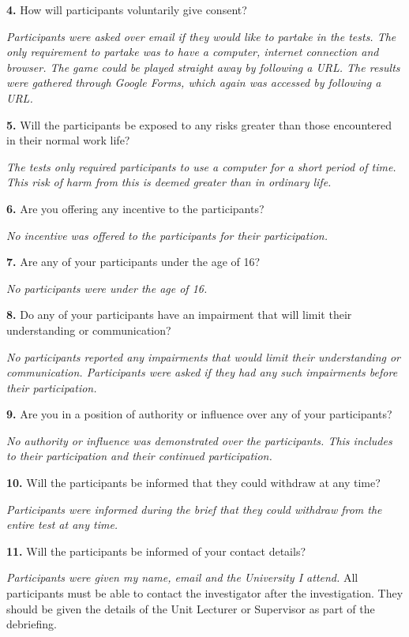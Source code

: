 \documentclass[a4paper,11.5pt]{report}
\numberwithin{figure}{section}
\numberwithin{table}{section}
\numberwithin{equation}{section}
\numberwithin{equation}{section}
\begin{document}
\textbf{4.}	How will participants voluntarily give consent?                       

\textit{Participants were asked over email if they would like to partake in the tests. The only requirement to partake was to have a computer, internet connection and browser. The game could be played straight away by following a URL. The results were gathered through Google Forms, which again was accessed by following a URL.}

\textbf{5.}	Will the participants be exposed to any risks greater than those encountered in their normal work life? 

\textit{The tests only required participants to use a computer for a short period of time. This risk of harm from this is deemed greater than in ordinary life.}

\textbf{6.}	Are you offering any incentive to the participants? 

\textit{No incentive was offered to the participants for their participation.}

\textbf{7.}	Are any of your participants under the age of 16?             

\textit{No participants were under the age of 16.}

\textbf{8.}	Do any of your participants have an impairment that will limit their understanding or communication?  

\textit{No participants reported any impairments that would limit their understanding or communication. Participants were asked if they had any such impairments before their participation.}

\textbf{9.}	Are you in a position of authority or influence over any of your participants?                                                                               

\textit{No authority or influence was demonstrated over the participants. This includes to their participation and their continued participation.}

\textbf{10.}	Will the participants be informed that they could withdraw at any time?

\textit{Participants were informed during the brief that they could withdraw from the entire test at any time.}
                                                                                 
\textbf{11.}	 Will the participants be informed of your contact details?   

\textit{Participants were given my name, email and the University I attend.}    
	All participants must be able to contact the investigator after the investigation. They should be given the details of the Unit Lecturer or Supervisor as part of the debriefing.
\end{document}
